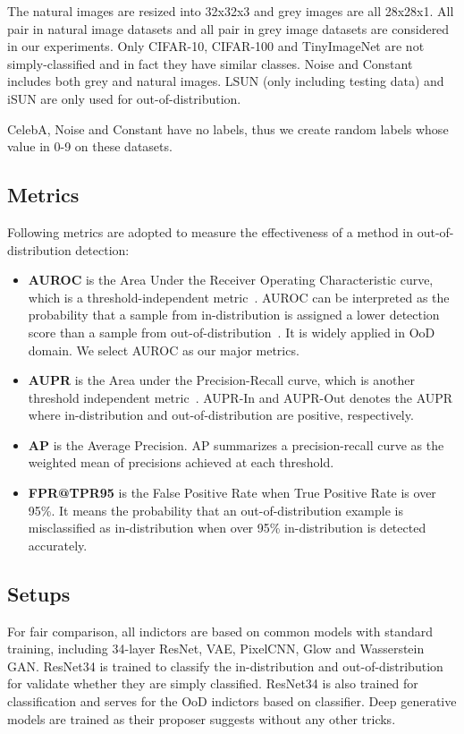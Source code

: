 \documentclass[letterpaper]{article} %
\begin{document}
The natural images are resized into 32x32x3 and grey images are all 28x28x1. All pair in natural image datasets and all pair in grey image datasets are considered in our experiments. Only CIFAR-10, CIFAR-100 and TinyImageNet are not simply-classified and in fact they have similar classes. Noise and Constant includes both grey and natural images. LSUN (only including testing data) and iSUN are only used for out-of-distribution. 

CelebA, Noise and Constant have no labels, thus we create random labels whose value in 0-9 on these datasets. 

\subsection{Metrics}
Following metrics are adopted to measure the effectiveness of a method in out-of-distribution detection:
\begin{itemize}
	\item \textbf{AUROC} is the Area Under the Receiver Operating Characteristic curve, which is a threshold-independent metric~\cite{davis2006relationship}. AUROC can be interpreted as the probability that a sample from in-distribution is assigned a lower detection score than a sample from out-of-distribution~\cite{fawcett2006introduction}. It is widely applied in OoD domain. We select AUROC as our major metrics. 
	\item \textbf{AUPR} is the Area under the Precision-Recall curve, which is another threshold independent metric~\cite{saito2015precision}. AUPR-In and AUPR-Out denotes the AUPR where in-distribution and out-of-distribution are positive, respectively.  
	\item \textbf{AP} is the Average Precision. AP summarizes a precision-recall curve as the weighted mean of precisions achieved at each threshold. 
	\item \textbf{FPR@TPR95} is the False Positive Rate when True Positive Rate is over 95\%. It means the probability that an out-of-distribution example is misclassified as in-distribution when over 95\% in-distribution is detected accurately.
\end{itemize} 

\subsection{Setups} 
For fair comparison, all indictors are based on common models with standard training, including 34-layer ResNet, VAE, PixelCNN, Glow and Wasserstein GAN. ResNet34 is trained to classify the in-distribution and out-of-distribution for validate whether they are simply classified. ResNet34 is also trained for classification and serves for the OoD indictors based on classifier. Deep generative models are trained as their proposer suggests without any other tricks. 
\end{document}
